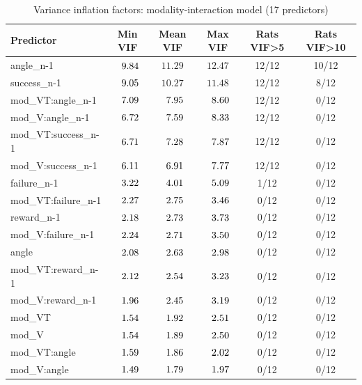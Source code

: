 \begin{table}[htbp]
\centering
\caption{Variance inflation factors: modality-interaction model (17 predictors)}
\label{tab:vif-modality-interaction}
\begin{tabular}{lccccc}
\toprule
Predictor & Min VIF & Mean VIF & Max VIF & Rats VIF\textgreater5 & Rats VIF\textgreater10 \\
\midrule
angle\_n-1 & $\hphantom{0}9.84$ & $11.29$ & $12.47$ & 12/12 & 10/12 \\
success\_n-1 & $\hphantom{0}9.05$ & $10.27$ & $11.48$ & 12/12 & 8/12 \\
mod\_VT:angle\_n-1 & $\hphantom{0}7.09$ & $\hphantom{0}7.95$ & $\hphantom{0}8.60$ & 12/12 & 0/12 \\
mod\_V:angle\_n-1 & $\hphantom{0}6.72$ & $\hphantom{0}7.59$ & $\hphantom{0}8.33$ & 12/12 & 0/12 \\
mod\_VT:success\_n-1 & $\hphantom{0}6.71$ & $\hphantom{0}7.28$ & $\hphantom{0}7.87$ & 12/12 & 0/12 \\
mod\_V:success\_n-1 & $\hphantom{0}6.11$ & $\hphantom{0}6.91$ & $\hphantom{0}7.77$ & 12/12 & 0/12 \\
failure\_n-1 & $\hphantom{0}3.22$ & $\hphantom{0}4.01$ & $\hphantom{0}5.09$ & 1/12 & 0/12 \\
\midrule
mod\_VT:failure\_n-1 & $\hphantom{0}2.27$ & $\hphantom{0}2.75$ & $\hphantom{0}3.46$ & 0/12 & 0/12 \\
reward\_n-1 & $\hphantom{0}2.18$ & $\hphantom{0}2.73$ & $\hphantom{0}3.73$ & 0/12 & 0/12 \\
mod\_V:failure\_n-1 & $\hphantom{0}2.24$ & $\hphantom{0}2.71$ & $\hphantom{0}3.50$ & 0/12 & 0/12 \\
angle & $\hphantom{0}2.08$ & $\hphantom{0}2.63$ & $\hphantom{0}2.98$ & 0/12 & 0/12 \\
mod\_VT:reward\_n-1 & $\hphantom{0}2.12$ & $\hphantom{0}2.54$ & $\hphantom{0}3.23$ & 0/12 & 0/12 \\
mod\_V:reward\_n-1 & $\hphantom{0}1.96$ & $\hphantom{0}2.45$ & $\hphantom{0}3.19$ & 0/12 & 0/12 \\
mod\_VT & $\hphantom{0}1.54$ & $\hphantom{0}1.92$ & $\hphantom{0}2.51$ & 0/12 & 0/12 \\
mod\_V & $\hphantom{0}1.54$ & $\hphantom{0}1.89$ & $\hphantom{0}2.50$ & 0/12 & 0/12 \\
mod\_VT:angle & $\hphantom{0}1.59$ & $\hphantom{0}1.86$ & $\hphantom{0}2.02$ & 0/12 & 0/12 \\
mod\_V:angle & $\hphantom{0}1.49$ & $\hphantom{0}1.79$ & $\hphantom{0}1.97$ & 0/12 & 0/12 \\

\end{tabular}
\end{table}
